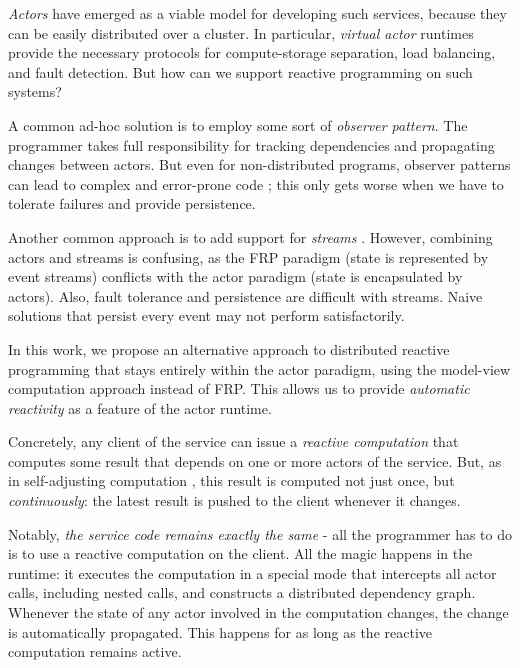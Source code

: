 \emph{Actors} have emerged as a viable model for developing such services, because they can be easily distributed over a cluster. In particular, \emph{virtual actor} runtimes provide the necessary protocols for compute-storage separation, load balancing, and fault detection. But how can we support reactive programming on such systems?
 
A common ad-hoc solution is to employ some sort of \emph{observer pattern}. The programmer takes full responsibility for tracking dependencies and propagating changes between actors. But even for non-distributed programs, observer patterns can lead to complex and error-prone code \cite{}; this only gets worse when we have to tolerate failures and provide persistence. 

Another common approach is to add support for \emph{streams} \cite{}. However, combining actors and streams is confusing, as the FRP paradigm (state is represented by event streams) conflicts with the actor paradigm (state is encapsulated by actors). Also, fault tolerance and persistence are difficult with streams. Naive solutions that persist every event may not perform satisfactorily. 

In this work, we propose an alternative approach to distributed reactive programming that stays entirely within the actor paradigm, using the model-view computation approach instead of FRP. This allows us to provide \emph{automatic reactivity} as a feature of the actor runtime. 

Concretely, any client of the service can issue a \emph{reactive computation} that computes some result that depends on one or more actors of the service. But, as in self-adjusting computation \cite{}, this result is computed not just once, but \emph{continuously}: the latest result is pushed to the client whenever it changes. 

Notably, \emph{the service code remains exactly the same} - all the programmer has to do is to use a reactive computation on the client.  All the magic happens in the runtime: it executes the computation in a special mode that intercepts all actor calls, including nested calls, and constructs a distributed dependency graph. Whenever the state of any actor involved in the computation changes, the change is automatically  propagated. This happens for as long as the reactive computation remains active. 
 


